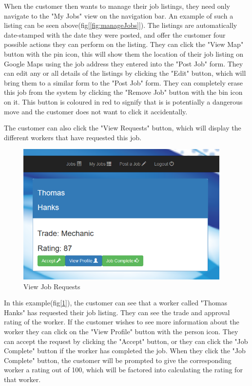 When the customer then wants to manage their job listings, they need only navigate to the "My Jobs" view on the navigation bar. An example of such a listing can be seen above(fig[\ref{fig:manageJobs}]). The listings are automatically date-stamped with the date they were posted, and offer the customer four possible actions they can perform on the listing. They can click the "View Map" button with the pin icon, this will show them the location of their job listing on Google Maps using the job address they entered into the "Post Job" form. They can edit any or all details of the listings by clicking the "Edit" button, which will bring them to a similar form to the "Post Job" form. They can completely erase this job from the system by clicking the "Remove Job" button with the bin icon on it. This button is coloured in red to signify that is is potentially a dangerous move and the customer does not want to click it accidentally.

\bigskip

The customer can also click the "View Requests" button, which will display the different workers that have requested this job.

\begin{figure}[H]
    \centering
    \includegraphics[width=\textwidth, height=200pt]{img/Customer4.PNG}
    \caption{View Job Requests}
    \label{fig:viewRequests}
\end{figure}

\bigskip

In this example(fig[\ref{fig:viewRequests}]), the customer can see that a worker called "Thomas Hanks" has requested their job listing. They can see the trade and approval rating of the worker. If the customer wishes to see more information about the worker they can click on the "View Profile" button with the person icon. They can accept the request by clicking the "Accept" button, or they can click the "Job Complete" button if the worker has completed the job. When they click the "Job Complete" button, the customer will be prompted to give the corresponding worker a rating out of 100, which will be factored into calculating the rating for that worker.

